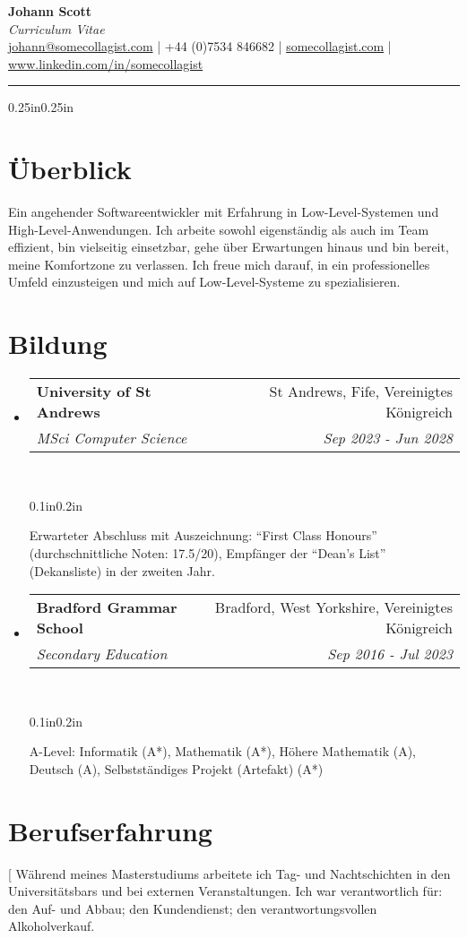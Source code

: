 \documentclass[a4paper]{article}
\makeatletter
\newcommand{\emailaddr}{johann@somecollagist.com}
\newcommand{\phonenumber}{+44 (0)7534 846682}
\newcommand{\website}{somecollagist.com}
\newcommand{\linkedin}{www.linkedin.com/in/somecollagist}
\newcommand{\resumeSubheading}[5][]{
  \vspace{2pt}\item
    \begin{tabular*}{0.875\textwidth}[t]{l@{\extracolsep{\fill}}r}
      \textbf{#2} & #3 \\
      \textit{\small#4} & \textit{\small #5} \\
    \end{tabular*}\\
    \vspace{-5pt}
    \begin{adjustwidth}{0.1in}{0.2in}
      #1
    \end{adjustwidth}
    \vspace{10pt}
}
\newcommand{\resumeSubheadingList}[1]{
  \begin{itemize}
    #1
  \end{itemize}
}
\makeatother
\begin{document}
\begin{center}
  \huge \textbf{Johann Scott} \\
  \normalsize \textit{Curriculum Vitae} \\
  \vspace{1em}
  {
    \href{mailto:\emailaddr}{\emailaddr} {|}
    {\phonenumber} {|}
    \href{https://\website}{\website} {|}
    \href{https://\linkedin}{\linkedin}
  } \\
  \vspace{1em}
  \rule{\linewidth}{1pt}
\end{center}

\begin{adjustwidth}{0.25in}{0.25in}

  \section{Überblick}
  Ein angehender Softwareentwickler mit Erfahrung in Low-Level-Systemen und
  High-Level-Anwendungen. Ich arbeite sowohl eigenständig als auch im Team
  effizient, bin vielseitig einsetzbar, gehe über Erwartungen hinaus und bin
  bereit, meine Komfortzone zu verlassen. Ich freue mich darauf, in ein
  professionelles Umfeld einzusteigen und mich auf Low-Level-Systeme zu
  spezialisieren.

  \section{Bildung}
    \resumeSubheadingList{
      \resumeSubheading[
        Erwarteter Abschluss mit Auszeichnung: ``First Class Honours'' (durchschnittliche Noten: 17.5/20), Empfänger
        der ``Dean's List'' \\ (Dekansliste) in der zweiten Jahr.
      ]
        {University of St Andrews}
        {St Andrews, Fife, Vereinigtes Königreich}
        {MSci Computer Science}
        {Sep 2023 {-} Jun 2028}
      \resumeSubheading[
        A-Level: Informatik (A*), Mathematik (A*), Höhere
        Mathematik (A), Deutsch (A), Selbstständiges Projekt (Artefakt) (A*)
      ]
        {Bradford Grammar School}
        {Bradford, West Yorkshire, Vereinigtes Königreich}
        {Secondary Education}
        {Sep 2016 {-} Jul 2023}
    }

  \section{Berufserfahrung}
    \resumeSubheadingList{
      \resumeSubheading[
        Während meines Masterstudiums arbeitete ich Tag- und Nachtschichten in
        den Universitätsbars und bei externen Veranstaltungen. Ich war
        verantwortlich für: den Auf- und Abbau; den Kundendienst; den
        verantwortungsvollen Alkoholverkauf.

}
\end{adjustwidth}
\end{document}
